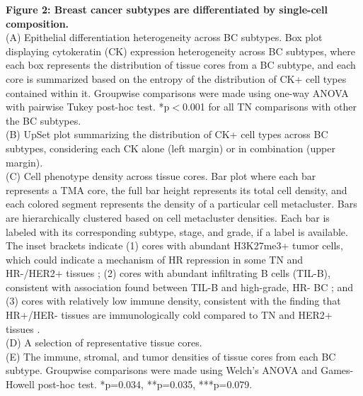 \documentclass[preprint,review,3p,12pt]{elsarticle}
\begin{document}
\noindent 
\textbf{Figure 2: Breast cancer subtypes are differentiated by single-cell composition.} \\
(A) Epithelial differentiation heterogeneity across BC subtypes. Box plot displaying cytokeratin (CK) expression heterogeneity across BC subtypes, where each box represents the distribution of tissue cores from a BC subtype, and each core is summarized based on the entropy of the distribution of CK+ cell types contained within it. Groupwise comparisons were made using one-way ANOVA with pairwise Tukey post-hoc test. *p$<$0.001 for all TN comparisons with other the BC subtypes.\\
(B) UpSet plot summarizing the distribution of CK+ cell types across BC subtypes, considering each CK alone (left margin) or in combination (upper margin).\\
(C) Cell phenotype density across tissue cores. Bar plot where each bar represents a TMA core, the full bar height represents its total cell density, and each colored segment represents the density of a particular cell metacluster. Bars are hierarchically clustered based on cell metacluster densities. Each bar is labeled with its corresponding subtype, stage, and grade, if a label is available. The inset brackets indicate (1) cores with abundant H3K27me3+ tumor cells, which could indicate a mechanism of HR repression in some TN and HR-/HER2+ tissues \cite{histone2016}; (2) cores with abundant infiltrating B cells (TIL-B), consistent with association found between TIL-B and high-grade, HR- BC \cite{bcell2019}; and (3) cores with relatively low immune density, consistent with the finding that HR+/HER- tissues are immunologically cold compared to TN and HER2+ tissues \cite{pdl1a2015,pdl1b2015}.\\
(D) A selection of representative tissue cores.\\
(E) The immune, stromal, and tumor densities of tissue cores from each BC subtype. Groupwise comparisons were made using Welch's ANOVA and Games-Howell post-hoc test. *p=0.034, **p=0.035, ***p=0.079.
\end{document}

